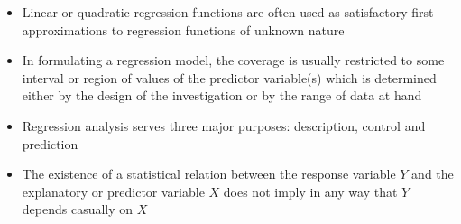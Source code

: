 \begin{itemize}
\item Linear or quadratic regression functions are often used as satisfactory first approximations to regression functions of unknown nature 
\item In formulating a regression model, the coverage is usually restricted to some interval or region of values of the predictor variable(s) which is determined either by the design of the investigation or by the range of data at hand 
\item Regression analysis serves three major purposes: description, control and prediction 
\item The existence of a statistical relation between the response variable $Y$ and the explanatory or predictor variable $X$ does not imply in any way that $Y$ depends casually on $X$ 
\end{itemize}

